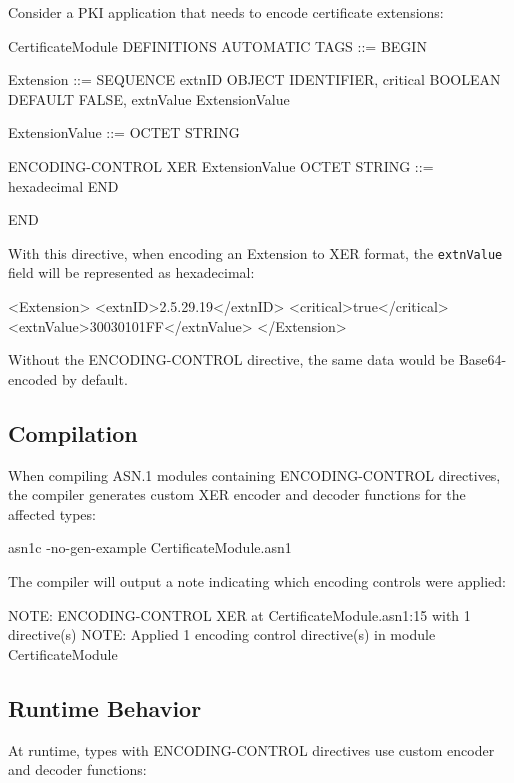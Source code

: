 \documentclass[english,oneside,12pt]{book}
\begin{document}
Consider a PKI application that needs to encode certificate extensions:

\begin{asn}
CertificateModule DEFINITIONS AUTOMATIC TAGS ::= BEGIN

Extension ::= SEQUENCE {
    extnID      OBJECT IDENTIFIER,
    critical    BOOLEAN DEFAULT FALSE,
    extnValue   ExtensionValue
}

ExtensionValue ::= OCTET STRING

ENCODING-CONTROL XER
    ExtensionValue OCTET STRING ::= hexadecimal
END

END
\end{asn}

With this directive, when encoding an Extension to XER format, the \texttt{extnValue} 
field will be represented as hexadecimal:

\begin{example}
<Extension>
    <extnID>2.5.29.19</extnID>
    <critical>true</critical>
    <extnValue>30030101FF</extnValue>
</Extension>
\end{example}

Without the ENCODING-CONTROL directive, the same data would be Base64-encoded by default.

\subsection*{Compilation}

When compiling ASN.1 modules containing ENCODING-CONTROL directives, the compiler 
generates custom XER encoder and decoder functions for the affected types:

\begin{bash}
asn1c -no-gen-example CertificateModule.asn1
\end{bash}

The compiler will output a note indicating which encoding controls were applied:

\begin{bash}
NOTE: ENCODING-CONTROL XER at CertificateModule.asn1:15 with 1 directive(s)
NOTE: Applied 1 encoding control directive(s) in module CertificateModule
\end{bash}

\subsection*{Runtime Behavior}

At runtime, types with ENCODING-CONTROL directives use custom encoder and decoder functions:
\end{document}
